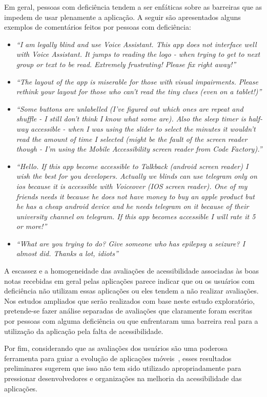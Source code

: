 Em geral, pessoas com deficiência tendem a ser enfáticas sobre as barreiras que as impedem de usar plenamente a aplicação. A seguir são apresentados alguns exemplos de comentários feitos por pessoas com deficiência:
\begin{itemize}
 \item \textit{``I am legally blind and use Voice Assistant. This app does not interface well with Voice Assistant. It jumps to reading the logo - when trying to get to next group or text to be read. Extremely frustrating! Please fix right away!''}
  \item \textit{``The layout of the app is miserable for those with visual impairments. Please rethink your layout for those who can't read the tiny clues (even on a tablet!)''}
  \item \textit{``Some buttons are unlabelled (I've figured out which ones are repeat and shuffle - I still don't think I know what some are). Also the sleep timer is half-way accessible - when I was using the slider to select the minutes it wouldn't read the amount of time I selected (might be the fault of the screen reader though - I'm using the Mobile Accessibility screen reader from Code Factory).''}
  \item \textit{``Hello. If this app become accessible to Talkback (android screen reader) I wish the best for you developers. Actually we blinds can use telegram only on ios because it is accessible with Voiceover (IOS screen reader). One of my friends needs it because he does not have money to buy an apple product but he has a cheap android device and he needs telegram on it because of their university channel on telegram. If this app becomes accessible I will rate it 5 or more!''}
  \item \textit{``What are you trying to do? Give someone who has epilepsy a seizure? I almost did. Thanks a lot, idiots''}  
\end{itemize}

A escassez e a homogeneidade das avaliações de acessibilidade associadas às boas notas recebidas em geral pelas aplicações parece indicar que ou os usuários com deficiência não utilizam essas aplicações ou eles tendem a não realizar avaliações. 
Nos estudos ampliados que serão realizados com base neste estudo exploratório, pretende-se fazer análise separadas de avaliações que claramente foram escritas por pessoas com alguma deficiência ou que enfrentaram uma barreira real para a utilização da aplicação pela falta de acessibilidade. 

Por fim, considerando que as avaliações dos usuários são uma poderosa ferramenta para guiar a evolução de aplicações móveis~\cite{Iacob2014online,Panichella2015how,Palomba2018crowdsourcing}, 
esses resultados preliminares sugerem que isso não tem sido utilizado apropriadamente para pressionar desenvolvedores e organizações na melhoria da acessibilidade das aplicações.

